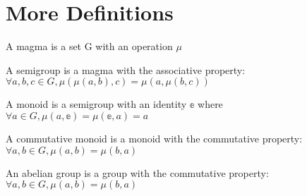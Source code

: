 \section{More Definitions}

\begin{definition}[Magma]
    \label{definition : Magma}
    \leanok
    A magma is a set G with an operation $\mu$
\end{definition}

\begin{definition}[Semigroup]
    \label{definition : Semigroup}
    \leanok
    A semigroup is a magma with the associative property: $\forall a, b, c \in G, \mu(\mu(a, b), c) = \mu(a, \mu(b, c))$
\end{definition}

\begin{definition}[Monoid]
    \label{definition : Monoid}
    \leanok
    A monoid is a semigroup with an identity $\mathbb{e}$ where $\forall a \in G, \mu (a, \mathbb{e}) = \mu(\mathbb{e}, a) = a$
\end{definition}

\begin{definition}
    \label{definition : CommMonoid}
    \leanok
    A commutative monoid is a monoid with the commutative property: $\forall a, b \in G, \mu(a, b) = \mu(b, a)$
\end{definition}

\begin{definition}
    \label{definition : AbelianGroup}
    \leanok
    An abelian group is a group with the commutative property: $\forall a, b \in G, \mu(a, b) = \mu(b, a)$
\end{definition}
